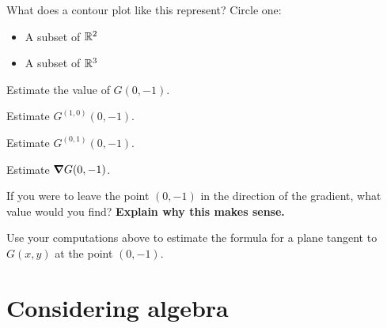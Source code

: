 \documentclass[handout,noauthor,nooutcomes]{ximera}
\begin{document}
\begin{problem}
  What does a contour plot like this represent? Circle one:
  \begin{multicols}{2}
    \begin{itemize}
    \item A subset of $\mathbb R^2$
    \item A subset of $\mathbb R^3$
    \end{itemize}
  \end{multicols}
\end{problem}

\begin{problem}
  Estimate the value of $G(0,-1)$.
\end{problem}

\begin{problem}
  Estimate $G^{(1,0)}(0,-1)$.
\end{problem}

\begin{problem}
  Estimate $G^{(0,1)}(0,-1)$.
\end{problem}

\begin{problem}
  Estimate $\boldsymbol\nabla G(0,-1)$.
\end{problem}

\begin{problem}
  If you were to leave the point $(0,-1)$ in the direction of the
  gradient, what value would you find? \textbf{Explain why this makes
    sense.}
\end{problem}

\begin{problem}
  Use your computations above to estimate the formula for a plane
  tangent to $G(x,y)$ at the point $(0,-1)$.
\end{problem}

\section{Considering algebra}
\end{document}
